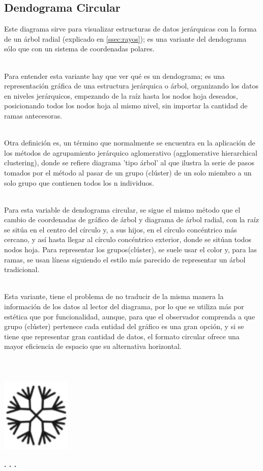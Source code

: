 \documentclass{article}\usepackage[]{graphicx}\usepackage[]{color}
\begin{document}
\subsection{Dendograma Circular}
Este diagrama sirve para visualizar estructuras de datos jer\'arquicas con la forma de un \'arbol radial (explicado en \ref{ssec:rayos}); es una variante del dendograma s\'olo que con un sistema de coordenadas polares.~\\~\par
Para entender esta variante hay que ver qu\'e es un dendograma; es una representaci\'on gr\'afica de una estructura jer\'arquica o \'arbol, organizando los datos en niveles jer\'arquicos, empezando de la ra\'iz hasta los nodos hoja deseados, posicionando todos los nodos hoja al mismo nivel, sin importar la cantidad de ramas antecesoras.~\\~\par
Otra definici\'on es, un t\'ermino que normalmente se encuentra en la aplicaci\'on de los m\'etodos de agrupamiento jer\'arquico aglomerativo (agglomerative hierarchical clustering), donde se refiere diagrama 'tipo \'arbol' al que ilustra la serie de pasos tomados por el m\'etodo al pasar de un grupo (cl\'uster) de un solo miembro a un solo grupo que contienen todos los n individuos\cite{dicc-stat}.~\\~\par
\clearpage
Para esta variable de dendograma circular,  se sigue el mismo m\'etodo que el cambio de coordenadas de gr\'afico de \'arbol y diagrama de \'arbol radial\cite{radial-tree-example}, con la ra\'iz se sit\'ua en el centro del c\'irculo y, a sus hijos, en el c\'irculo conc\'entrico m\'as cercano, y as\'i hasta llegar al c\'irculo conc\'entrico exterior, donde se sit\'uan todos nodos hoja. Para representar los grupos(cl\'uster), se suele usar el color y, para las ramas, se usan l\'ineas siguiendo el estilo m\'as parecido de representar un \'arbol tradicional\cite{den}.~\\~\par
Esta variante, tiene el problema de no traducir de la misma manera la informaci\'on de los datos al lector del diagrama, por lo que se utiliza m\'as por est\'etica que por funcionalidad, aunque, para que el observador comprenda a que grupo (cl\'uster) pertenece cada entidad del gr\'afico es una gran opci\'on, y si se tiene que representar gran cantidad de datos, el formato circular ofrece una mayor eficiencia de espacio que su alternativa horizontal.
~\\~\\~\\~\\
\vbox{
    \centering
    \includegraphics[width=0.25\textwidth]{imag/dendo}
}
\begin{center}
\textbf{. . .}
\end{center}
~\\~\\
\end{document}
